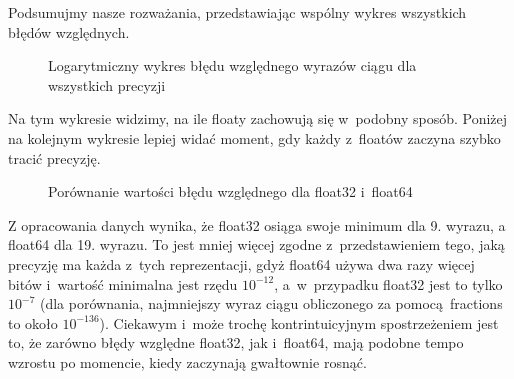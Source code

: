 \newpage
Podsumujmy nasze rozważania, przedstawiając wspólny wykres wszystkich błędów względnych.
\begin{figure}[h!]
	\caption{Logarytmiczny wykres błędu względnego wyrazów ciągu dla wszystkich precyzji}
	\label{zad2:graph10}
\end{figure}

Na tym wykresie widzimy, na ile floaty zachowują się w~podobny sposób. Poniżej na kolejnym wykresie lepiej widać 
moment, gdy każdy z~floatów zaczyna szybko tracić precyzję.

\begin{figure}[h!]
	\caption{Porównanie wartości błędu względnego dla float32 i~float64}
	\label{zad2:graph11}
\end{figure}

Z opracowania danych wynika, że float32 osiąga swoje minimum dla 9. wyrazu, a float64 dla 19. wyrazu. To jest mniej więcej zgodne z~przedstawieniem tego, jaką precyzję ma każda z~tych reprezentacji, gdyż float64 używa dwa razy więcej bitów i~wartość minimalna jest rzędu $10^{-12}$, a~w~przypadku float32 jest to tylko $10^{-7}$ (dla porównania, najmniejszy wyraz ciągu obliczonego za pomocą fractions to około $10^{-136}$). Ciekawym i~może trochę kontrintuicyjnym spostrzeżeniem jest to, że zarówno błędy względne float32, jak i~float64, mają podobne tempo wzrostu po momencie, kiedy zaczynają gwałtownie rosnąć.

\newpage  

